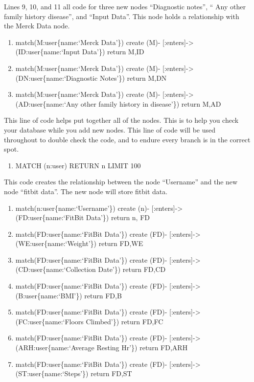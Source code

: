 \documentclass[]{book}
\providecommand{\tightlist}{%
  \setlength{\itemsep}{0pt}\setlength{\parskip}{0pt}}
\begin{document}
Lines 9, 10, and 11 all code for three new nodes ``Diagnostic notes'',
`` Any other family history disease'', and ``Input Data''. This node
holds a relationship with the Merck Data node.

\begin{enumerate}
\def\labelenumi{\arabic{enumi}.}
\setcounter{enumi}{8}
\tightlist
\item
  match(M:user\{name:`Merck Data'\}) create (M)-
  {[}:enters{]}-\textgreater{} (ID:user\{name:`Input Data'\}) return
  M,ID
\item
  match(M:user\{name:`Merck Data'\}) create (M)-
  {[}:enters{]}-\textgreater{} (DN:user\{name:`Diagnostic Notes'\})
  return M,DN
\item
  match(M:user\{name:`Merck Data'\}) create (M)-
  {[}:enters{]}-\textgreater{} (AD:user\{name:`Any other family history
  in disease'\}) return M,AD
\end{enumerate}

This line of code helps put together all of the nodes. This is to help
you check your database while you add new nodes. This line of code will
be used throughout to double check the code, and to endure every branch
is in the correct spot.

\begin{enumerate}
\def\labelenumi{\arabic{enumi}.}
\setcounter{enumi}{11}
\tightlist
\item
  MATCH (n:user) RETURN n LIMIT 100
\end{enumerate}

This code creates the relationship between the node ``Username'' and the
new node ``fitbit data''. The new node will store fitbit data.

\begin{enumerate}
\def\labelenumi{\arabic{enumi}.}
\setcounter{enumi}{12}
\tightlist
\item
  match(n:user\{name:`Username'\}) create (n)-
  {[}:enters{]}-\textgreater{} (FD:user\{name:`FitBit Data'\}) return n,
  FD
\item
  match(FD:user\{name:`FitBit Data'\}) create (FD)-
  {[}:enters{]}-\textgreater{} (WE:user\{name:`Weight'\}) return FD,WE
\item
  match(FD:user\{name:`FitBit Data'\}) create (FD)-
  {[}:enters{]}-\textgreater{} (CD:user\{name:`Collection Date'\})
  return FD,CD
\item
  match(FD:user\{name:`FitBit Data'\}) create (FD)-
  {[}:enters{]}-\textgreater{} (B:user\{name:`BMI'\}) return FD,B
\item
  match(FD:user\{name:`FitBit Data'\}) create (FD)-
  {[}:enters{]}-\textgreater{} (FC:user\{name:`Floors Climbed'\}) return
  FD,FC
\item
  match(FD:user\{name:`FitBit Data'\}) create (FD)-
  {[}:enters{]}-\textgreater{} (ARH:user\{name:`Average Resting Hr'\})
  return FD,ARH
\item
  match(FD:user\{name:`FitBit Data'\}) create (FD)-
  {[}:enters{]}-\textgreater{} (ST:user\{name:`Steps'\}) return FD,ST
\end{enumerate}
\end{document}
